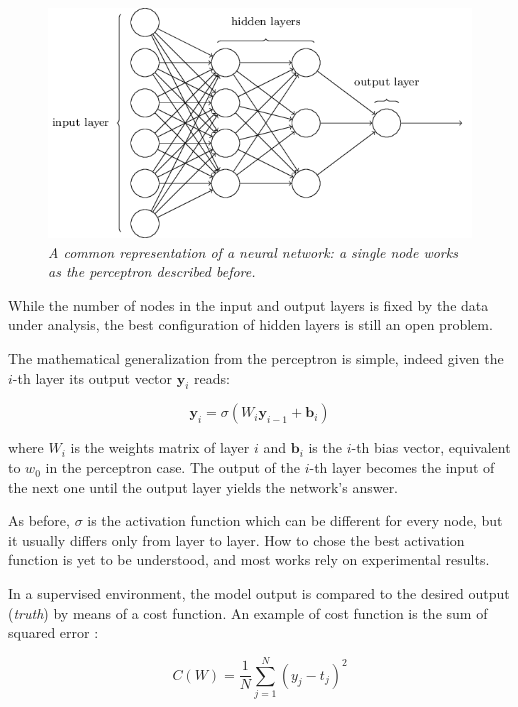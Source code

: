 \documentclass[12pt,a4paper]{report}
\begin{document}
\begin{figure}[h]
 \centering
 \includegraphics[scale=0.5]{./images/neural_net.png}
 \caption{{\it A common representation of a neural network: a single node works as the perceptron described before.}}
 \label{fig:ann}
\end{figure}

While the number of nodes in the input and output layers is fixed by the data under analysis, the best configuration of hidden layers is still an open problem.

The mathematical generalization from the perceptron is simple, indeed given the $i$-th layer its output vector $\bm{y}_i$ reads:  

\begin{equation}
 \bm{y}_i = \sigma(W_i \bm{y}_{i-1} + \bm{b}_i)
\end{equation}

where $W_i$ is the weights matrix of layer $i$ and $\bm{b}_i$ is the $i$-th bias vector, equivalent to $w_0$ in the perceptron case.
The output of the $i$-th layer becomes the input of the next one until the output layer yields the network's answer. 

As before, $\sigma$ is the activation function which can be different for every node, but it usually differs only from layer to layer. 
How to chose the best activation function is yet to be understood, and most works rely on experimental results.

In a supervised environment, the model output is compared to the desired output ({\it truth}) by means of a cost function. 
An example of cost function is the sum of squared error : 

\begin{equation}
  C(W) = \frac{1}{N} \sum_{j=1}^{N} (y_j - t_j)^2
\end{equation}
\end{document}

